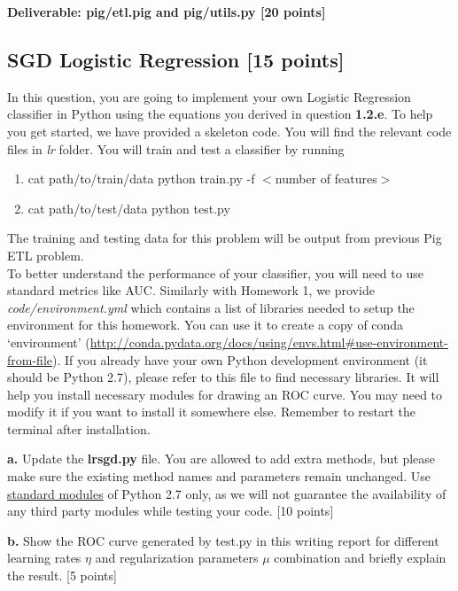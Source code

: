 \documentclass[12pt]{article}
\begin{document}
\textbf{Deliverable: pig/etl.pig and pig/utils.py [20 points]}

\subsection{SGD Logistic Regression [15 points]}
In this question, you are going to implement your own Logistic Regression classifier in Python using the equations you derived in question \textbf{1.2.e}. To help you get started, we have provided a skeleton code. You will find the relevant code files in \textit{lr} folder. You will train and test a classifier by running 
\begin{enumerate}
\item cat path/to/train/data \textbar{} python train.py -f $<$number of features$>$
\item cat path/to/test/data \textbar{} python test.py 
\end{enumerate}
The training and testing data for this problem will be output from previous Pig ETL problem. \\

To better understand the performance of your classifier, you will need to use standard metrics like AUC. Similarly with Homework 1, we provide \textit{code/environment.yml} which contains a list of libraries needed to setup the environment for this homework. You can use it to create a copy of conda `environment' (\href{http://conda.pydata.org/docs/using/envs.html#use-environment-from-file}{http://conda.pydata.org/docs/using/envs.html\#use-environment-from-file}). If you already have your own Python development environment (it should be Python 2.7), please refer to this file to find necessary libraries. It will help you install necessary modules for drawing an ROC curve. You may need to modify it if you want to install it somewhere else. Remember to restart the terminal after installation.

\textbf{a.} Update the \textbf{lrsgd.py} file. You are allowed to add extra methods, but please make sure the existing method names and parameters remain unchanged. Use \href{https://docs.python.org/2/library/}{standard modules} of Python 2.7 only, as we will not guarantee the availability of any third party modules while testing your code. [10 points]

\textbf{b.} Show the ROC curve generated by test.py in this writing report for different learning rates $\eta$ and regularization parameters $\mu$ combination and briefly explain the result. [5 points]
\end{document}
